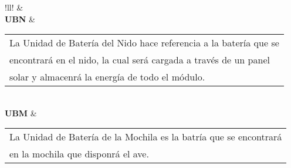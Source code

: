 \begin{table}[H]
\centering
\begin{tabular}{!{\color{AzulTable}\vrule}ll!{\color{AzulTable}\vrule}}
\hline
{}
 &  \\ \hline
\textbf{UBN}		& \begin{tabular}[l]{@{}l@{}}La Unidad de Batería del Nido hace referencia a la batería que se\\ encontrará en el nido, la cual será cargada a través de un panel\\ solar y almacenrá la energía de todo el módulo.\end{tabular}							\\ \hline
\textbf{UBM}		& \begin{tabular}[l]{@{}l@{}}La Unidad de Batería de la Mochila es la batría que se encontrará\\ en la mochila que disponrá el ave.\end{tabular}						\\ \hline
\end{tabular}
\end{table}

